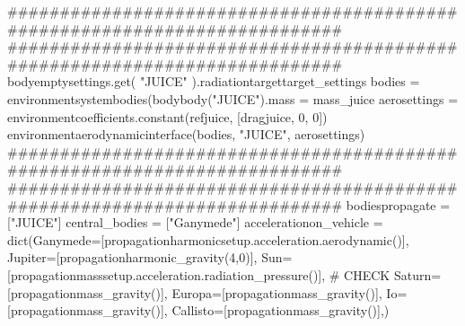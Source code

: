 {}###########################################################################\markdownRendererInterblockSeparator
{}
\markdownRendererSectionEnd \markdownRendererSectionBegin
{}\markdownRendererInterblockSeparator
{}########################################################################### bodyemptysettings.get( "JUICE" ).radiationtargettarget_settings\markdownRendererInterblockSeparator
{}
\markdownRendererSectionEnd \markdownRendererSectionBegin
{}\markdownRendererInterblockSeparator
{}bodies = environmentsystembodies(bodybody("JUICE").mass = mass_juice\markdownRendererInterblockSeparator
{}
\markdownRendererSectionEnd \markdownRendererSectionBegin
{}\markdownRendererInterblockSeparator
{}aerosettings = environmentcoefficients.constant(refjuice, [dragjuice, 0, 0]) environmentaerodynamicinterface(bodies, "JUICE", aerosettings)\markdownRendererInterblockSeparator
{}###########################################################################\markdownRendererInterblockSeparator
{}
\markdownRendererSectionEnd \markdownRendererSectionBegin
{}\markdownRendererInterblockSeparator
{}###########################################################################\markdownRendererInterblockSeparator
{}
\markdownRendererSectionEnd \markdownRendererSectionBegin
{}\markdownRendererInterblockSeparator
{}bodiespropagate = ["JUICE"] central_bodies = ["Ganymede"]\markdownRendererInterblockSeparator
{}
\markdownRendererSectionEnd \markdownRendererSectionBegin
{}\markdownRendererInterblockSeparator
{}accelerationon_vehicle = dict(Ganymede=[propagationharmonicsetup.acceleration.aerodynamic()], Jupiter=[propagationharmonic_gravity(4,0)], Sun=[propagationmasssetup.acceleration.radiation_pressure()], # CHECK Saturn=[propagationmass_gravity()], Europa=[propagationmass_gravity()], Io=[propagationmass_gravity()], Callisto=[propagationmass_gravity()],)\markdownRendererInterblockSeparator
